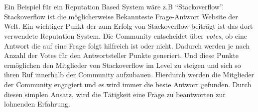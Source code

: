 \documentclass[a4paper,12pt]{scrartcl}
\begin{document}
\\\\
Ein Beispiel für ein Reputation Based System wäre z.B \enquote{Stackoverflow}. Stackoverflow ist die möglicherweise Bekannteste Frage-Antwort Website der Welt. Ein wichtiger Punkt der zum Erfolg von Stackoverflow beiträgt ist das dort verwendete Reputation System. Die Community entscheidet über \textit{votes}, ob eine Antwort die auf eine Frage folgt hilfreich ist oder nicht. Dadurch werden je nach Anzahl der Votes für den Antwortsteller Punkte generiert. Und diese Punkte ermöglichen den Mitglieder von Stackoverflow im Level zu steigen und sich so ihren Ruf innerhalb der Community aufzubauen. Hierdurch werden die Mitglieder der Community engagiert und es wird immer die beste Antwort gefunden. Durch diesen simplen Ansatz, wird die Tätigkeit eine Frage zu beantworten zur lohnenden Erfahrung.
\end{document}
